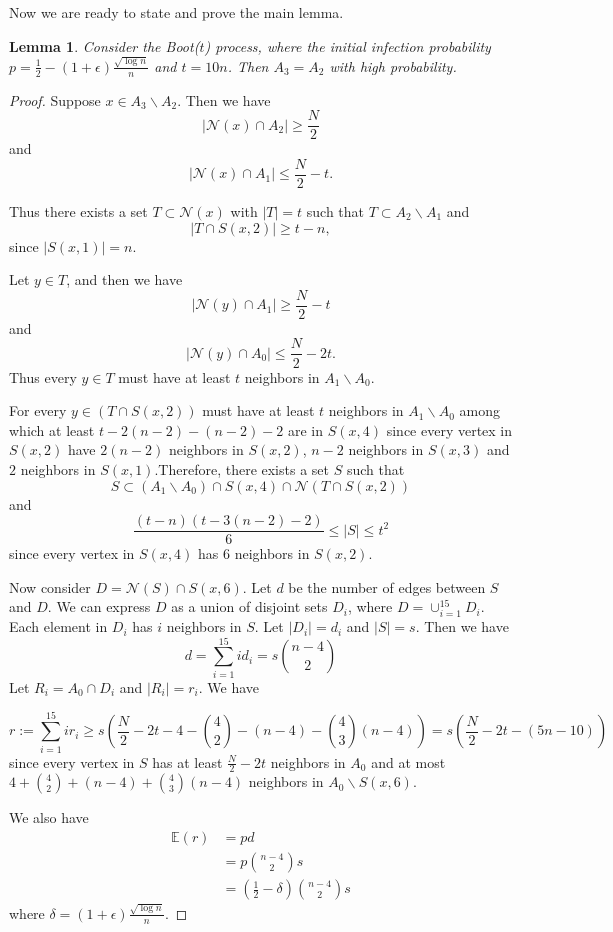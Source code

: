\documentclass[reqno,11pt]{amsart}
\newtheorem{lemma}[theorem]{Lemma}
\renewcommand{\leq}{\leqslant}
\renewcommand{\geq}{\geqslant}
\begin{document}
Now we are ready to state and prove the main lemma.
\begin{lemma} \label{lemmaA18}
 Consider the Boot($t$) process, where the initial infection probability $p= \frac{1}{2}-(1+\epsilon)\frac{ \sqrt{\log n}}{n}$ and $t=10n$. Then $A_3=A_2$ with high probability.
\end{lemma}
\begin{proof}
    Suppose $x \in A_3 \backslash A_2$.  Then we have 
$$|\mathcal{N}(x) \cap A_2| \geq \frac{N}{2}$$ and 
$$|\mathcal{N}(x) \cap A_1| \leq \frac{N}{2}-t.$$
    
    
Thus there exists a set $T \subset \mathcal{N}(x)$ with $|T|=t$ such that $T \subset A_2 \backslash A_1$ and 
$$|T \cap S(x,2)| \geq t-n,$$
since $|S(x,1)|=n$.

Let $y \in T$, and then we have 
$$|\mathcal{N}(y) \cap A_1| \geq \frac{N}{2}-t$$ and 
$$|\mathcal{N}(y) \cap A_0| \leq \frac{N}{2}-2t.$$
Thus every $y \in T$ must have at least $t$ neighbors in $A_1 \backslash A_0$.

For every $y \in (T \cap S(x,2))$ must have at least $t$ neighbors in $A_1 \backslash A_0$ among which at least $t-2(n-2)-(n-2)-2$ are in $S(x,4)$ since every vertex in $S(x,2)$ have $2(n-2)$ neighbors in $S(x,2)$, $n-2$ neighbors in $S(x,3)$ and $2$ neighbors in $S(x,1)$.Therefore, there exists a set $S$ such that 
$$S \subset (A_1 \backslash A_0) \cap S(x,4) \cap \mathcal{N}(T \cap S(x,2))$$
and 
$$ \frac{(t-n)(t-3(n-2)-2)}{6}\leq |S| \leq t^2$$
since every vertex in $S(x,4)$ has $6$ neighbors in $S(x,2)$.

Now consider $D=\mathcal{N}(S) \cap S(x,6)$. Let $d$ be the number of edges between $S$ and $D$. We can express $D$ as a union of disjoint sets $D_i$, where $D = \cup_{i=1}^{15} D_i$. Each element in $D_i$ has $i$ neighbors in $S$. Let $|D_i|=d_i$ and $|S|=s$. Then we have 
$$d=\sum_{i=1}^{15}i d_i=s\binom{n-4}{2}$$
Let $R_i=A_0 \cap D_i$ and $|R_i|=r_i$. We have

    $$r:=\sum_{i=1}^{15}i r_i \geq s\left(\frac{N}{2}-2t-4-\binom{4}{2}-(n-4)-\binom{4}{3}(n-4) \right)=s\left(\frac{N}{2}-2t-(5n-10) \right)$$
since every vertex in $S$ has at least $\frac{N}{2}-2t$ neighbors in $A_0$ and at most $4+\binom{4}{2}+(n-4)+\binom{4}{3}(n-4)$ neighbors in $A_0 \backslash S(x,6)$. 

We also have 
\begin{align*}
\mathbb{E}(r) &=pd\\
&=p\binom{n-4}{2}s \\
&=\left(\frac{1}{2}-\delta\right)\binom{n-4}{2}s
\end{align*}
where  $\delta=(1+\epsilon)\frac{ \sqrt{\log n}}{n}$.


\end{proof}
\end{document}

